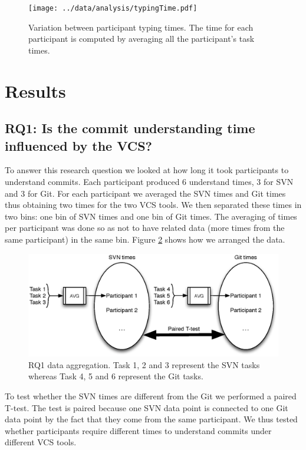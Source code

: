 \documentclass[letterpaper]{article}
\begin{document}
\begin{figure}[H]
    \centering
    \texttt{[image: ../data/analysis/typingTime.pdf]}
    \caption{Variation between participant typing times. The time for each participant is computed by averaging all the participant's task times.}
    \label{fig:typingTimes}
\end{figure}

\section{Results}

\subsection{RQ1: Is the commit understanding time influenced by the VCS?}

To answer this research question we looked at how long it took participants to understand commits.
Each participant produced 6 understand times, 3 for SVN and 3 for Git.
For each participant we averaged the SVN times and Git times thus obtaining two times for the two VCS tools.
We then separated these times in two bins: one bin of SVN times and one bin of Git times. 
The averaging of times per participant was done so as not to have related data (more times from the same participant) in the same bin.
Figure \ref{fig:rq1-data} shows how we arranged the data.

\begin{figure}[H]
    \centering
    \includegraphics[width=1\textwidth]{fig/RQ1-data}
    \caption{RQ1 data aggregation. Task 1, 2 and 3 represent the SVN tasks whereas Task 4, 5 and 6 represent the Git tasks.}
    \label{fig:rq1-data}
\end{figure}

To test whether the SVN times are different from the Git we performed a paired T-test.
The test is paired because one SVN data point is connected to one Git data point by the fact that they come from the same participant.
We thus tested whether participants require different times to understand commits under different VCS tools.
\end{document}
